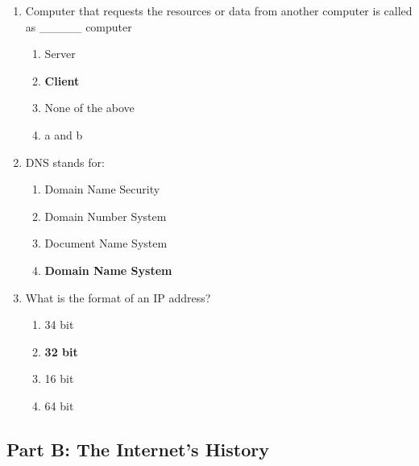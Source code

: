 \documentclass{article}
\begin{document}
\begin{enumerate}[label=\arabic*.]
    \item Computer that requests the resources or data from another computer is called as \_\_\_\_\_ computer
          \begin{enumerate}
              \item Server
              \item \textbf{Client}
              \item None of the above
              \item a and b
          \end{enumerate}

    \item DNS stands for:
          \begin{enumerate}
              \item Domain Name Security
              \item Domain Number System
              \item Document Name System
              \item \textbf{Domain Name System}
          \end{enumerate}

    \item What is the format of an IP address?
          \begin{enumerate}
              \item 34 bit
              \item \textbf{32 bit}
              \item 16 bit
              \item 64 bit
          \end{enumerate}

\end{enumerate}

\subsection*{Part B: The Internet's History}
\end{document}
